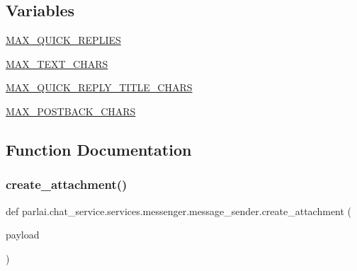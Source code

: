 \subsection*{Variables}
\begin{DoxyCompactItemize}
\item 
\hyperlink{namespaceparlai_1_1chat__service_1_1services_1_1messenger_1_1message__sender_a73d3d32925149a01cd7005255a71d99f}{M\+A\+X\+\_\+\+Q\+U\+I\+C\+K\+\_\+\+R\+E\+P\+L\+I\+ES}
\item 
\hyperlink{namespaceparlai_1_1chat__service_1_1services_1_1messenger_1_1message__sender_a872dc6a7eb395325350ce0aac85b3325}{M\+A\+X\+\_\+\+T\+E\+X\+T\+\_\+\+C\+H\+A\+RS}
\item 
\hyperlink{namespaceparlai_1_1chat__service_1_1services_1_1messenger_1_1message__sender_a95718c6928fac361e48080166391b53c}{M\+A\+X\+\_\+\+Q\+U\+I\+C\+K\+\_\+\+R\+E\+P\+L\+Y\+\_\+\+T\+I\+T\+L\+E\+\_\+\+C\+H\+A\+RS}
\item 
\hyperlink{namespaceparlai_1_1chat__service_1_1services_1_1messenger_1_1message__sender_a2b5e0ba431e5734c5f4c87d442622e18}{M\+A\+X\+\_\+\+P\+O\+S\+T\+B\+A\+C\+K\+\_\+\+C\+H\+A\+RS}
\end{DoxyCompactItemize}


\subsection{Function Documentation}
\mbox{\label{namespaceparlai_1_1chat__service_1_1services_1_1messenger_1_1message__sender_a8303c44a600b84c0d42770128be13e9a}} 
\subsubsection{\texorpdfstring{create\+\_\+attachment()}{create\_attachment()}}
{\footnotesize\ttfamily def parlai.\+chat\+\_\+service.\+services.\+messenger.\+message\+\_\+sender.\+create\+\_\+attachment (\begin{DoxyParamCaption}\item[{}]{payload }\end{DoxyParamCaption})}

